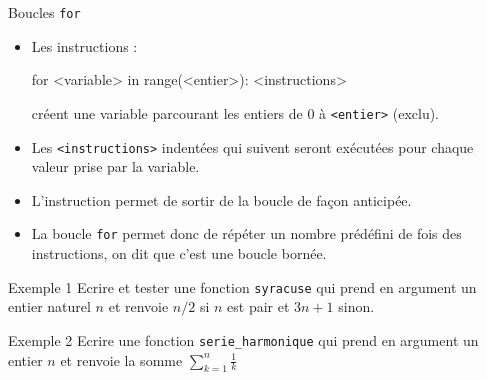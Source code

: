 \documentclass[10pt]{beamer}
\begin{document}
\begin{frame}[fragile]{\Ctitle}{\stitle}
	\begin{alertblock}{Boucles {\tt for}}
		\begin{itemize}
			\item<2-> Les instructions :
				\begin{codepython}
					for <variable> in range(<entier>):
					<instructions>
				\end{codepython}
				créent une variable parcourant les entiers de 0 à {\tt <entier>} (exclu).
			\item<3-> Les {\tt <instructions>} indentées qui suivent seront exécutées pour chaque valeur prise par la variable.
			\item<4-> L'instruction  permet de sortir de la boucle de façon anticipée.
			\item<5-> La boucle {\tt for} permet donc de répéter un nombre prédéfini de fois des instructions, on dit que c'est une boucle bornée.
		\end{itemize}
	\end{alertblock}
\end{frame}


\begin{frame}[fragile]{\Ctitle}{\stitle}
	\begin{exampleblock}{Exemple 1}
		Ecrire et tester une fonction {\tt syracuse} qui prend en argument un entier naturel $n$ et renvoie $n/2$ si $n$ est pair et $3n+1$ sinon. \\
		\onslide<2->
	\end{exampleblock}
\end{frame}

\begin{frame}[fragile]{\Ctitle}{\stitle}
	\begin{exampleblock}{Exemple 2}
		Ecrire une fonction {\tt serie\_harmonique} qui prend en argument un entier $n$ et renvoie la somme $\displaystyle{\sum_{k=1}^n \frac{1}{k}}$
		\onslide<2->
	\end{exampleblock}
\end{frame}
\end{document}
